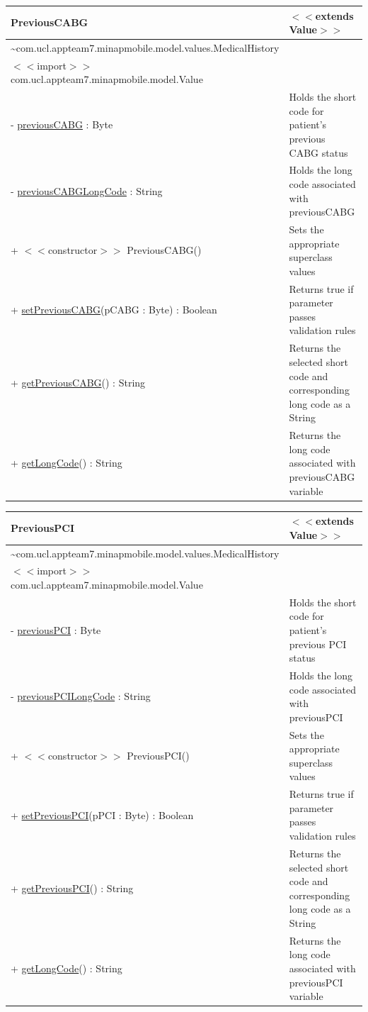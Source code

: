 \documentclass[12pt,a4paper,oneside,titlepage]{article}
\begin{document}
\begin{center}
	\begin{tabular}{| p{13cm} | p{5cm} |}
	\hline
	\textbf{PreviousCABG} & \textbf{$<<$extends Value$>>$} \\ \hline
	\textasciitilde com.ucl.appteam7.minapmobile.model.values.MedicalHistory	  & \\ \hline
$<<$import$>>$ com.ucl.appteam7.minapmobile.model.Value	  & \\ \hline \hline
- \underline{previousCABG} : Byte	 & Holds the short code for patient's previous CABG status \\ \hline
- \underline{previousCABGLongCode} : String	 & Holds the long code associated with previousCABG \\ \hline \hline
+ $<<$constructor$>>$ PreviousCABG() & 	Sets the appropriate superclass values \\ \hline
+ \underline{setPreviousCABG}(pCABG : Byte) : Boolean	 & Returns true if parameter passes validation rules \\ \hline
+ \underline{getPreviousCABG}() : String	 & Returns the selected short code and corresponding long code as a String \\ \hline
+ \underline{getLongCode}() : String	 & Returns the long code associated with previousCABG variable \\ \hline
	\end{tabular}
\end{center}

\begin{center}
	\begin{tabular}{| p{13cm} | p{5cm} |}
	\hline
	\textbf{PreviousPCI} & \textbf{$<<$extends Value$>>$} \\ \hline
	\textasciitilde com.ucl.appteam7.minapmobile.model.values.MedicalHistory	 &  \\ \hline
$<<$import$>>$ com.ucl.appteam7.minapmobile.model.Value	 &  \\ \hline \hline
- \underline{previousPCI} : Byte	 & Holds the short code for patient's previous PCI status \\ \hline
- \underline{previousPCILongCode} : String & 	Holds the long code associated with previousPCI \\ \hline \hline
+ $<<$constructor$>>$ PreviousPCI()	 & Sets the appropriate superclass values \\ \hline
+ \underline{setPreviousPCI}(pPCI : Byte) : Boolean	 & Returns true if parameter passes validation rules \\ \hline
+ \underline{getPreviousPCI}() : String & 	Returns the selected short code and corresponding long code as a String \\ \hline
+ \underline{getLongCode}() : String & 	Returns the long code associated with previousPCI variable \\ \hline
	\end{tabular}
\end{center}
\end{document}
